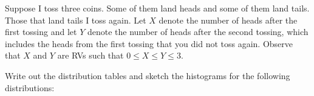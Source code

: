 \documentclass[addpoints,12pt]{exam}
\begin{document}
\begin{questions}
\addpoints

\question[8] Suppose I toss three coins. Some of them land heads and some of them land tails. Those that land tails I toss again. Let $X$ denote the number of heads after the first tossing and let $Y$ denote the number of heads after the second tossing, which includes the heads from the first tossing that you did not toss again. Observe that $X$ and $Y$ are RVs such that $0\leq X \leq Y \leq 3$.

Write out the distribution tables and sketch the histograms for the following distributions:

\noaddpoints
{}
\end{questions}
\end{document}
